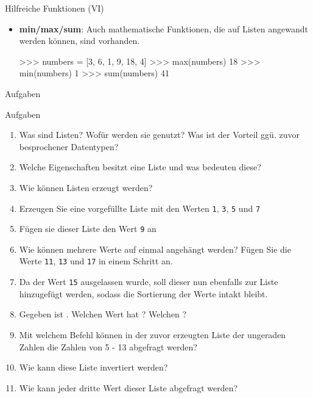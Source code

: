          \begin{frame}[fragile]{Hilfreiche Funktionen (VI)}
            \begin{itemize}
                \item \textbf{min/max/sum}: Auch mathematische Funktionen, die auf Listen angewandt werden können, sind vorhanden.
                
\begin{pyconcode}
>>> numbers = [3, 6, 1, 9, 18, 4]
>>> max(numbers)
18
>>> min(numbers)
1
>>> sum(numbers)
41
\end{pyconcode} 


            \end{itemize}
         \end{frame}
         
    
    \begin{subsubsection}{Aufgaben}
        \begin{frame}[allowframebreaks]{Aufgaben}
            \begin{enumerate}
                \item Was sind Listen? Wofür werden sie genutzt? Was ist der Vorteil ggü. zuvor besprochener Datentypen?
                \item Welche Eigenschaften besitzt eine Liste und was bedeuten diese?
                \item Wie können Listen erzeugt werden?
                \item Erzeugen Sie eine vorgefüllte Liste mit den Werten \texttt{1}, \texttt{3}, \texttt{5} und \texttt{7}
                \item Fügen sie dieser Liste den Wert \texttt{9} an
                \item Wie können mehrere Werte auf einmal angehängt werden? Fügen Sie die Werte \texttt{11}, \texttt{13} und \texttt{17} in einem Schritt an.
                \item Da der Wert \texttt{15} ausgelassen wurde, soll dieser nun ebenfalls zur Liste hinzugefügt werden, sodass die Sortierung der Werte intakt bleibt.
                \item Gegeben ist . Welchen Wert hat ? Welchen ?
                \item Mit welchem Befehl können in der zuvor erzeugten Liste der ungeraden Zahlen die Zahlen von 5 - 13 abgefragt werden?
                \item Wie kann diese Liste invertiert werden?
                \item Wie kann jeder dritte Wert dieser Liste abgefragt werden?

\end{enumerate}
\end{frame}
\end{subsubsection}
